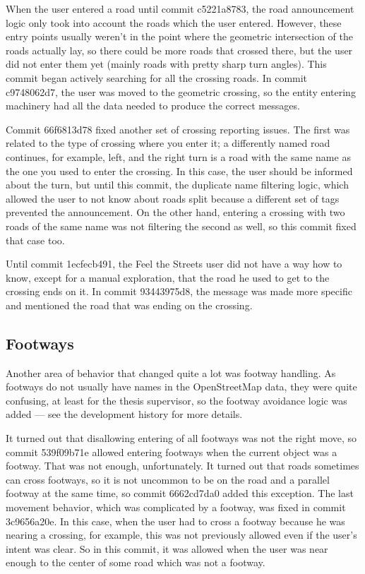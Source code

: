 \documentclass[nolof,digital]{fithesis3}
\begin{document}
When the user entered a road until commit c5221a8783, the road announcement logic only took into account the roads which the user entered. However, these entry points usually weren't in the point where the geometric intersection of the roads actually lay, so there could be more roads that crossed there, but the user did not enter them yet (mainly roads with pretty sharp turn angles). This commit began actively searching for all the crossing roads. In commit c9748062d7, the user was moved to the geometric crossing, so the entity entering machinery had all the data needed to produce the correct messages.

Commit 66f6813d78 fixed another set of crossing reporting issues. The first was related to the type of crossing where you enter it; a differently named road continues, for example, left, and the right turn is a road with the same name as the one you used to enter the crossing. In this case, the user should be informed about the turn, but until this commit, the duplicate name filtering logic, which allowed the user to not know about roads split because a different set of tags prevented the announcement. On the other hand, entering a crossing with two roads of the same name was not filtering the second as well, so this commit fixed that case too.

Until commit 1ecfecb491, the Feel the Streets user did not have a way how to know, except for a manual exploration, that the road he used to get to the crossing ends on it. In commit 93443975d8, the message was made more specific and mentioned the road that was ending on the crossing.
\subsection{Footways} \label{ref:footways}
Another area of behavior that changed quite a lot was footway handling. As footways do not usually have names in the OpenStreetMap data, they were quite confusing, at least for the thesis supervisor, so the footway avoidance logic was added --- see the development history for more details.

It turned out that disallowing entering of all footways was not the right move, so commit 539f09b71e allowed entering footways when the current object was a footway. That was not enough, unfortunately. It turned out that roads sometimes can cross footways, so it is not uncommon to be on the road and a parallel footway at the same time, so commit 6662cd7da0 added this exception. The last movement behavior, which was complicated by a footway, was fixed in commit 3c9656a20e. In this case, when the user had to cross a footway because he was nearing a crossing, for example, this was not previously allowed even if the user's intent was clear. So in this commit, it was allowed when the user was near enough to the center of some road which was not a footway.
\end{document}
